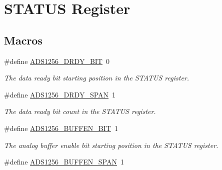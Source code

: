 \hypertarget{group__status__register}{\section{S\-T\-A\-T\-U\-S Register}
\label{group__status__register}
}
\subsection*{Macros}
\begin{DoxyCompactItemize}
\item 
\hypertarget{group__status__register_ga8836defa503977dda06238596f6bb8e3}{\#define \hyperlink{group__status__register_ga8836defa503977dda06238596f6bb8e3}{A\-D\-S1256\-\_\-\-D\-R\-D\-Y\-\_\-\-B\-I\-T}~0}\label{group__status__register_ga8836defa503977dda06238596f6bb8e3}

\begin{DoxyCompactList}\small\item\em The data ready bit starting position in the S\-T\-A\-T\-U\-S register. \end{DoxyCompactList}\item 
\hypertarget{group__status__register_ga39195cf60d4a91b0b61a5461ed1a5a67}{\#define \hyperlink{group__status__register_ga39195cf60d4a91b0b61a5461ed1a5a67}{A\-D\-S1256\-\_\-\-D\-R\-D\-Y\-\_\-\-S\-P\-A\-N}~1}\label{group__status__register_ga39195cf60d4a91b0b61a5461ed1a5a67}

\begin{DoxyCompactList}\small\item\em The data ready bit count in the S\-T\-A\-T\-U\-S register. \end{DoxyCompactList}\item 
\hypertarget{group__status__register_ga2cbdb7cbaac91a12c2818e87b97a4906}{\#define \hyperlink{group__status__register_ga2cbdb7cbaac91a12c2818e87b97a4906}{A\-D\-S1256\-\_\-\-B\-U\-F\-F\-E\-N\-\_\-\-B\-I\-T}~1}\label{group__status__register_ga2cbdb7cbaac91a12c2818e87b97a4906}

\begin{DoxyCompactList}\small\item\em The analog buffer enable bit starting position in the S\-T\-A\-T\-U\-S register. \end{DoxyCompactList}\item 
\hypertarget{group__status__register_gae477a7ad4b56f4a0579a674f5ef44d26}{\#define \hyperlink{group__status__register_gae477a7ad4b56f4a0579a674f5ef44d26}{A\-D\-S1256\-\_\-\-B\-U\-F\-F\-E\-N\-\_\-\-S\-P\-A\-N}~1}\label{group__status__register_gae477a7ad4b56f4a0579a674f5ef44d26}


\end{DoxyCompactItemize}
